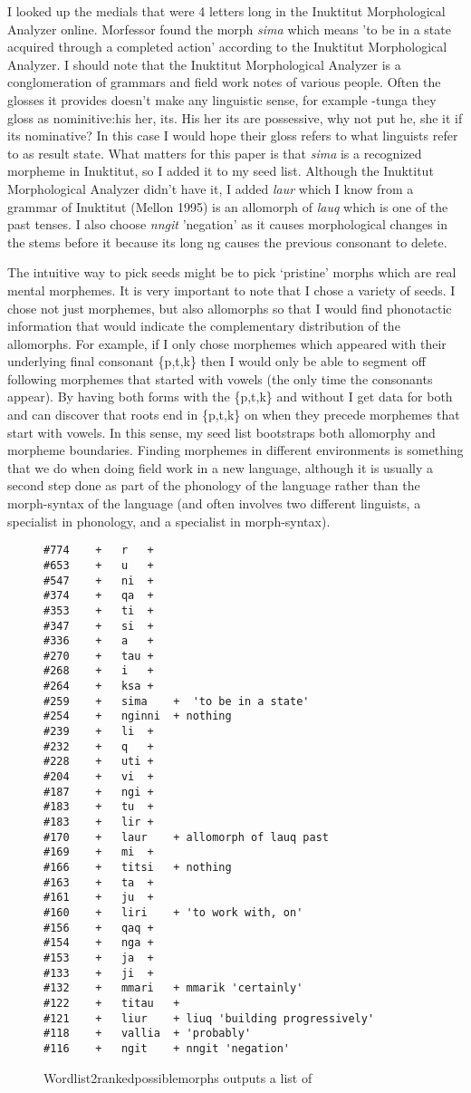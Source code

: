 \documentclass[runningheads,a4paper]{llncs}
\begin{document}
I looked up the medials that were 4 letters long in the Inuktitut Morphological Analyzer online. Morfessor found the morph \textit{sima} which means 'to be in a state acquired through a completed action' according to the Inuktitut Morphological Analyzer. I should note that the Inuktitut Morphological Analyzer is a conglomeration of grammars and field work notes of various people. Often the glosses it provides doesn't make any linguistic sense, for example -tunga they gloss as nominitive:his her, its. His her its are possessive, why not put he, she it if its nominative? In this case I would hope their gloss refers to what linguists refer to as result state. What matters for this paper is that \textit{sima} is a recognized morpheme in Inuktitut, so I added it to my seed list. Although the Inuktitut Morphological Analyzer didn't have it, I added \textit{laur} which I know from a grammar of Inuktitut (Mellon 1995) is an allomorph of \textit{lauq} which is one of the past tenses. I also choose \textit{nngit} 'negation' as it causes morphological changes in the stems before it because its long ng causes the previous consonant to delete.

The intuitive way to pick seeds might be to pick `pristine' morphs which are real mental morphemes. It is very important to note that I chose a variety of seeds. I chose not just morphemes, but also allomorphs so that I would find phonotactic information that would indicate the complementary distribution of the allomorphs. For example, if I only chose morphemes which appeared with their underlying final consonant \{p,t,k\} then I would only be able to segment off following morphemes that started with vowels (the only time the consonants appear). By having both forms with the \{p,t,k\} and without I get data for both and can discover that roots end in \{p,t,k\} on when they precede morphemes that start with vowels. In this sense, my seed list bootstraps both allomorphy and morpheme boundaries. Finding morphemes in different environments is something that we do when doing field work in a new language, although it is usually a second step done as part of the phonology of the language rather than the morph-syntax of the language (and often involves two different linguists, a specialist in phonology, and a specialist in morph-syntax).

\begin{figure}
\begin{verbatim}
#774	+	r	+
#653	+	u	+
#547	+	ni	+
#374	+	qa	+
#353	+	ti	+
#347	+	si	+
#336	+	a	+
#270	+	tau	+
#268	+	i	+
#264	+	ksa	+
#259	+	sima	+  'to be in a state'
#254	+	nginni	+ nothing
#239	+	li	+
#232	+	q	+
#228	+	uti	+
#204	+	vi	+
#187	+	ngi	+
#183	+	tu	+
#183	+	lir	+
#170	+	laur	+ allomorph of lauq past
#169	+	mi	+
#166	+	titsi	+ nothing
#163	+	ta	+
#161	+	ju	+
#160	+	liri	+ 'to work with, on'
#156	+	qaq	+
#154	+	nga	+
#153	+	ja	+
#133	+	ji	+
#132	+	mmari	+ mmarik 'certainly' 
#122	+	titau	+
#121	+	liur	+ liuq 'building progressively'
#118	+	vallia	+ 'probably'
#116	+	ngit	+ nngit 'negation'
\end{verbatim}
	\caption{Wordlist2rankedpossiblemorphs outputs a list of }
	\label{fig:morfessormedials}
\end{figure}
\end{document}
